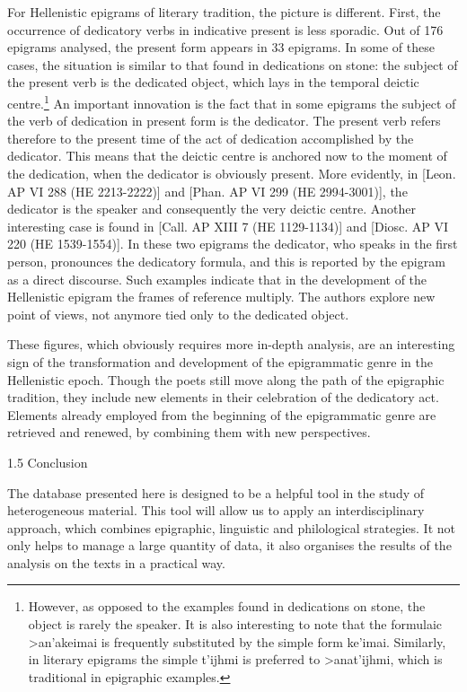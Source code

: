 \documentclass[amsthm,ebook]{saparticle}
\begin{document}
For Hellenistic epigrams of literary tradition, the picture is different. First, the occurrence of dedicatory verbs in
indicative present is less sporadic. Out of 176 epigrams analysed, the present form appears in 33 epigrams. In some of
these cases, the situation is similar to that found in dedications on stone: the subject of the present verb is the
dedicated object, which lays in the temporal deictic centre.\footnote{ However, as opposed to the examples found in
dedications on stone, the object is rarely the speaker. It is also interesting to note that the formulaic
\textgreek{>an'akeimai }is frequently substituted by the simple form \textgreek{ke'imai. }Similarly, in literary
epigrams the simple \textgreek{t'ijhmi }is preferred to \textgreek{>anat'ijhmi, }which is traditional in epigraphic
examples.} An important innovation is the fact that in some epigrams the subject of the verb of dedication in present
form is the dedicator. The present verb refers therefore to the present time of the act of dedication accomplished by
the dedicator. This means that the deictic centre is anchored now to the moment of the dedication, when the dedicator
is obviously present. More evidently, in [Leon. AP VI 288 (HE 2213-2222)] and [Phan. AP VI 299 (HE 2994-3001)], the
dedicator is the speaker and consequently the very deictic centre. Another interesting case is found in [Call. AP XIII
7 (HE 1129-1134)] and [Diosc. AP VI 220 (HE 1539-1554)]. In these two epigrams the dedicator, who speaks in the first
person, pronounces the dedicatory formula, and this is reported by the epigram as a direct discourse. Such examples
indicate that in the development of the Hellenistic epigram the frames of reference multiply. The authors explore new
point of views, not anymore tied only to the dedicated object.

These figures, which obviously requires more in-depth analysis, are an interesting sign of the transformation and
development of the epigrammatic genre in the Hellenistic epoch. Though the poets still move along the path of the
epigraphic tradition, they include new elements in their celebration of the dedicatory act. Elements already employed
from the beginning of the epigrammatic genre are retrieved and renewed, by combining them with new perspectives. 

1.5 Conclusion

The database presented here is designed to be a helpful tool in the study of heterogeneous material. This tool will
allow us to apply an interdisciplinary approach, which combines epigraphic, linguistic and philological strategies. It
not only helps to manage a large quantity of data, it also organises the results of the analysis on the texts in a
practical way. 
\end{document}
